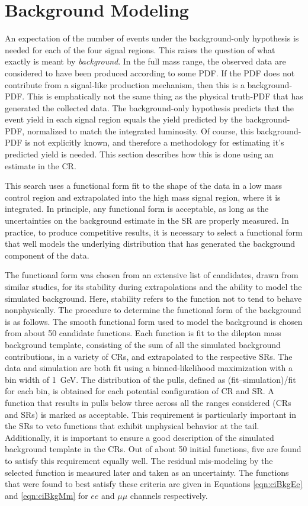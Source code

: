 \section{Background Modeling}\label{sec:ciBkg}

An expectation of the number of events under the background-only hypothesis is needed for each of the four signal regions.
This raises the question of what exactly is meant by \emph{background}.
In the full mass range, the observed data are considered to have been produced according to some PDF.
If the PDF does not contribute from a signal-like production mechanism, then this is a background-PDF.
This is emphatically not the same thing as the physical truth-PDF that has generated the collected data.
The background-only hypothesis predicts that the event yield in each signal region equals the yield predicted by the background-PDF, normalized to match the integrated luminosity.
Of course, this background-PDF is not explicitly known, and therefore a methodology for estimating it's predicted yield is needed.
This section describes how this is done using an estimate in the CR.

This search uses a functional form fit to the shape of the data in a low mass control region and extrapolated into the high mass signal region, where it is integrated.
In principle, any functional form is acceptable, as long as the uncertainties on the background estimate in the SR are properly measured.
In practice, to produce competitive results, it is necessary to select a functional form that well models the underlying distribution that has generated the background component of the data.

The functional form was chosen from an extensive list of candidates, drawn from similar studies, for its stability during extrapolations and the ability to model the simulated background. Here, stability refers to the function not to tend to behave nonphysically.
The procedure to determine the functional form of the background is as follows.
The smooth functional form used to model the background is chosen from about 50 candidate functions.
Each function is fit to the dilepton mass background template, consisting of the sum of all the simulated background contributions, in a variety of CRs, and extrapolated to the respective SRs.
The data and simulation are both fit using a binned-likelihood maximization with a bin width of 1~GeV.
The distribution of the pulls, defined as (fit--simulation)/fit for each bin, is obtained for each potential configuration of CR and SR.
A function that results in pulls below three across all the ranges considered (CRs and SRs) is marked as acceptable.
This requirement is particularly important in the SRs to veto functions that exhibit unphysical behavior at the tail.
Additionally, it is important to ensure a good description of the simulated background template in the CRs.
Out of about 50 initial functions, five are found to satisfy this requirement equally well.
The residual mis-modeling by the selected function is measured later and taken as an uncertainty.
The functions that were found to best satisfy these criteria are given in Equations \ref{eqn:ciBkgEe} and \ref{eqn:ciBkgMm} for $ee$ and $\mu\mu$ channels respectively.

